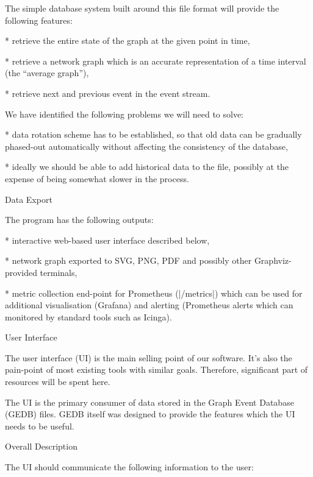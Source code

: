 The simple database system built around this file format will provide the
following features:

\begitems

* retrieve the entire state of the graph at the given point in time,

* retrieve a network graph which is an accurate representation of a time
interval (the ``average graph''),

* retrieve next and previous event in the event stream.

\enditems

We have identified the following problems we will need to solve:

\begitems

* data rotation scheme has to be established, so that old data can be gradually
phased-out automatically without affecting the consistency of the database,

* ideally we should be able to add historical data to the file, possibly at the
expense of being somewhat slower in the process.

\enditems


\sec Data Export

The program has the following outputs:

\begitems

* interactive web-based user interface described below,

* network graph exported to SVG, PNG, PDF and possibly other Graphviz-provided
terminals,

* metric collection end-point for Prometheus (|/metrics|) which can be used for
additional visualisation (Grafana) and alerting (Prometheus alerts which can
monitored by standard tools such as Icinga).

\enditems



\sec User Interface

The user interface (UI) is the main selling point of our software. It's also
the pain-point of most existing tools with similar goals. Therefore, significant
part of resources will be spent here.

The UI is the primary consumer of data stored in the Graph Event Database
(GEDB) files. GEDB itself was designed to provide the features which the UI
needs to be useful.

\secc Overall Description

The UI should communicate the following information to the user:

